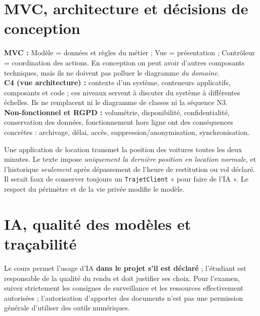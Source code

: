\documentclass[10pt,a4paper]{article}
\begin{document}
\section{MVC, architecture et décisions de conception}
\textbf{MVC :} Modèle = données et règles du métier ; Vue = présentation ; Contrôleur = coordination des actions. En conception on peut avoir d'autres composants techniques, mais ils ne doivent pas polluer le diagramme \emph{du domaine}.\\
\textbf{C4 (vue architecture) :} contexte d'un système, conteneurs applicatifs, composants et code ; ces niveaux servent à discuter du système à différentes échelles. Ils ne remplacent ni le diagramme de classes ni la séquence N3.\\
\textbf{Non-fonctionnel et RGPD :} volumétrie, disponibilité, confidentialité, conservation des données, fonctionnement hors ligne ont des conséquences concrètes : archivage, délai, accès, suppression/anonymisation, synchronisation.
\begin{exobox}
Une application de location transmet la position des voitures toutes les deux minutes. Le texte impose \emph{uniquement la dernière position en location normale}, et l'historique \emph{seulement} après dépassement de l'heure de restitution ou vol déclaré. Il serait faux de conserver toujours un \texttt{TrajetClient} « pour faire de l'IA ». Le respect du périmètre et de la vie privée modifie le modèle.
\end{exobox}

\section{IA, qualité des modèles et traçabilité}
Le cours permet l'usage d'IA \textbf{dans le projet s'il est déclaré} ; l'étudiant est responsable de la qualité du rendu et doit justifier ses choix. Pour l'examen, suivez strictement les consignes de surveillance et les ressources effectivement autorisées ; l'autorisation d'apporter des documents n'est pas une permission générale d'utiliser des outils numériques.
\end{document}
